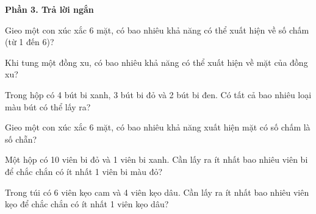 \textbf{Phần 3. Trả lời ngắn}

\begin{ex} %
Gieo một con xúc xắc 6 mặt, có bao nhiêu khả năng có thể xuất hiện về số chấm (từ 1 đến 6)?
\end{ex}

\begin{ex} %
Khi tung một đồng xu, có bao nhiêu khả năng có thể xuất hiện về mặt của đồng xu?
\end{ex}

\begin{ex} %
Trong hộp có 4 bút bi xanh, 3 bút bi đỏ và 2 bút bi đen. Có tất cả bao nhiêu loại màu bút có thể lấy ra?
\end{ex}

\begin{ex} %
Gieo một con xúc xắc 6 mặt, có bao nhiêu khả năng xuất hiện mặt có số chấm là số chẵn?
\end{ex}

\begin{ex} %
Một hộp có 10 viên bi đỏ và 1 viên bi xanh. Cần lấy ra ít nhất bao nhiêu viên bi để chắc chắn có ít nhất 1 viên bi màu đỏ?
\end{ex}

\begin{ex} %
Trong túi có 6 viên kẹo cam và 4 viên kẹo dâu. Cần lấy ra ít nhất bao nhiêu viên kẹo để chắc chắn có ít nhất 1 viên kẹo dâu?
\end{ex}
